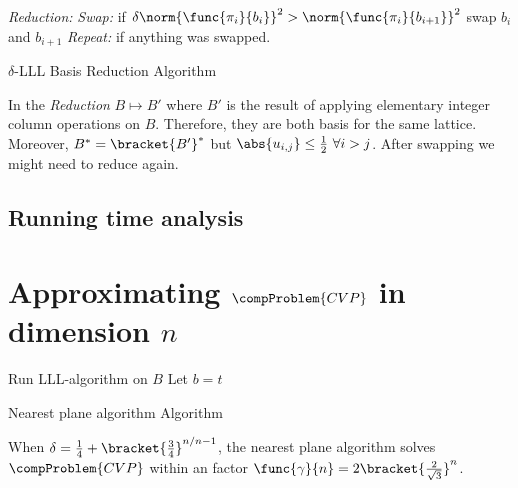  \begin{algorithm}
    \DontPrintSemicolon
    \emph{Reduction:}\;
    \emph{Swap:} if \(\delta \norm{\func{\pi_i}{b_i}}^2 > \norm{\func{\pi_i}{b_{i+1}}}^2\) swap \(b_i\) and \(b_{i+1}\)\;
    \emph{Repeat:} if anything was swapped.\;
    \caption{\(\delta\)-LLL Basis Reduction Algorithm}
\end{algorithm}
In the \emph{Reduction} \(B \mapsto B'\) where \(B'\) is the result of applying elementary integer column operations on \(B\). Therefore, they are both basis for  the same lattice. Moreover, \(B^{\ast}  = \bracket{B'}^{\ast}\) but \(\abs{u_{i,j}} \leq \frac{1}{2} \ \forall i > j\).
After swapping we might need to reduce again. 
\subsection{Running time analysis}
\section{Approximating \(\compProblem{CVP}\) in dimension \(n\)}
\begin{algorithm}
    \DontPrintSemicolon
    Run LLL-algorithm on \(B\)\;
    Let \(b = t\)\; 
    \caption{Nearest plane algorithm Algorithm}
\end{algorithm}

\begin{lemma}
    When \(\delta = \frac{1}{4} + \bracket{\frac{3}{4}}^{n/n-1}\), the nearest plane algorithm solves \(\compProblem{CVP}\) within an factor \(\func{\gamma}{n} = 2 \bracket{\frac{2}{\sqrt{3}}}^n\).
\end{lemma}